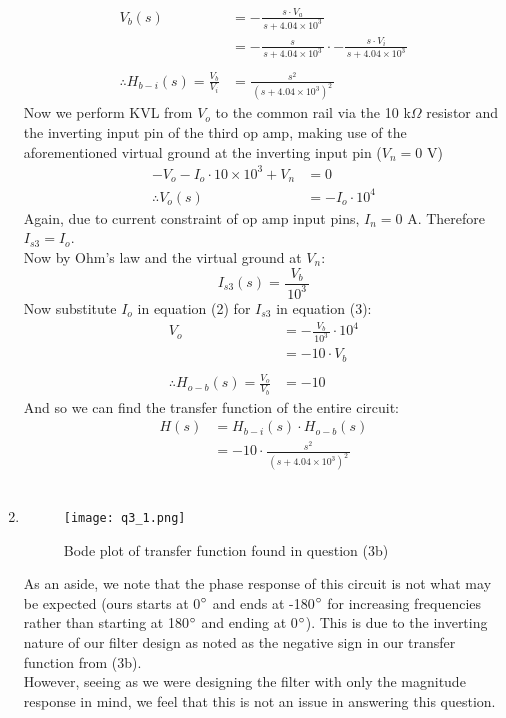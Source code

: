 \begin{enumerate}
{\begin{align*}
			V_b(s) &= -\frac{s \cdot V_a}{\, s + 4.04 \times 10^3 \,} \\
			&= -\frac{s}{\, s + 4.04 \times 10^3 \,} \cdot -\frac{s \cdot V_i}{\, s + 4.04 \times 10^3 \,} \\
			\\
			\therefore H_{b-i}(s) = \frac{V_b}{V_i} &= \frac{s^2}{\, \left(s + 4.04 \times 10^3 \right)^2 \,}
		\end{align*}
		Now we perform KVL from $V_o$ to the common rail via the 10 k$\Omega$ resistor and the inverting input pin of the third op amp, making use of the aforementioned virtual ground at the inverting input pin ($V_n = 0$ V)
		\begin{align}
			-V_o - I_o \cdot 10 \times 10^3 + V_n &= 0 \nonumber \\
			\therefore V_o(s) &= - I_o \cdot 10^4
		\end{align}
		Again, due to current constraint of op amp input pins, $I_n = 0$ A. Therefore $I_{s3} = I_o$. \\
		Now by Ohm's law and the virtual ground at $V_n$:
		\begin{equation}
			I_{s3}(s) = \frac{V_b}{\, 10^3 \,}
		\end{equation}
		Now substitute $I_o$ in equation (2) for $I_{s3}$ in equation (3):
		\begin{align*}
			V_o &= -\frac{V_b}{\, 10^3 \,} \cdot 10^4 \\
			&= -10 \cdot V_b \\
			\\
			\therefore H_{o-b}(s) = \frac{V_o}{V_b} &= -10
		\end{align*}
		And so we can find the transfer function of the entire circuit:
		\begin{align*}
			H(s) &= H_{b-i}(s) \cdot H_{o-b}(s) \\
			&= -10 \cdot \frac{s^2}{\, \left(s + 4.04 \times 10^3 \right)^2 \,}
		\end{align*}
		\\
	}
	
	\item{ 
		\quad 	%
		\begin{figure}[H]
			\centering
			\texttt{[image: q3\_1.png]}
			\caption{Bode plot of transfer function found in question (3b)}
		\end{figure}
		As an aside, we note that the phase response of this circuit is not what may be expected (ours starts at 0$\degree$ and ends at -180$\degree$ for increasing frequencies rather than starting at 180$\degree$ and ending at 0$\degree$). This is due to the inverting nature of our filter design as noted as the negative sign in our transfer function from (3b). \\
		However, seeing as we were designing the filter with only the magnitude response in mind, we feel that this is not an issue in answering this question.
		\\
	}
	
\end{enumerate}